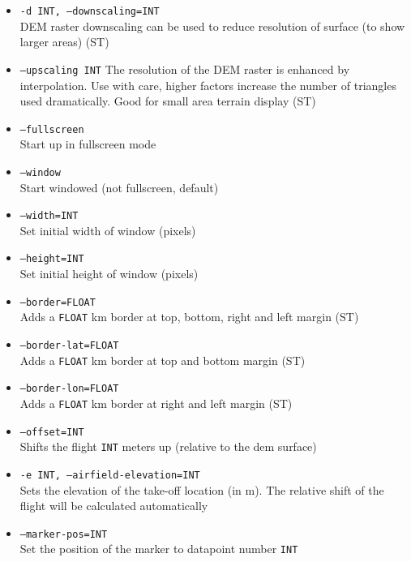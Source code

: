 \begin{itemize}
\item \texttt{-d INT, --downscaling=INT} \\
DEM raster downscaling can be used to reduce resolution of surface (to show larger areas) (ST)

\item \texttt{--upscaling INT}
The resolution of the DEM raster is enhanced by interpolation. Use with care,  higher factors increase the number of
triangles used dramatically. Good for small area terrain display (ST)

\item \texttt{--fullscreen} \\
Start up in fullscreen mode

\item \texttt{--window} \\
Start windowed (not fullscreen, default)

\item \texttt{--width=INT} \\
Set initial width of window (pixels)

\item \texttt{--height=INT } \\
Set initial height of window (pixels)

\item \texttt{--border=FLOAT } \\
Adds a \texttt{FLOAT} km border at top, bottom, right and left margin (ST)

\item \texttt{--border-lat=FLOAT} \\
Adds a \texttt{FLOAT} km border at top and bottom margin (ST)

\item \texttt{--border-lon=FLOAT} \\
Adds a \texttt{FLOAT} km border at right and left margin (ST)

\item \texttt{--offset=INT} \\
Shifts the flight \texttt{INT} meters up (relative to the dem surface)

\item \texttt{-e INT, --airfield-elevation=INT} \\
Sets the elevation of the take-off location (in m). The relative shift of the flight will be calculated automatically

\item \texttt{--marker-pos=INT } \\
Set the position of the marker to datapoint number \texttt{INT}


\end{itemize}
